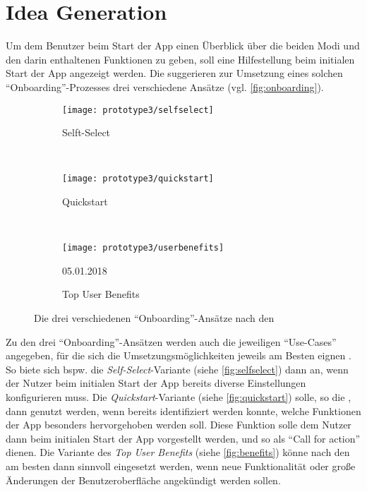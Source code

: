 \section{Idea Generation}\label{sec:idea3}
Um dem Benutzer beim Start der App einen Überblick über die beiden Modi und den darin enthaltenen Funktionen zu geben, soll eine Hilfestellung beim initialen Start der App angezeigt werden.
Die \mg{} suggerieren zur Umsetzung eines solchen ``Onboarding''-Prozesses drei verschiedene Ansätze (vgl. \autoref{fig:onboarding}). \\

\begin{figure}[h]
	\begin{subfigure}[t]{0.3\textwidth}
		\centering
		\texttt{[image: prototype3/selfselect]}
		\caption{Selft-Select}
		\label{fig:selfselect}
	\end{subfigure}
	~
	\begin{subfigure}[t]{0.3\textwidth}
		\centering
		\texttt{[image: prototype3/quickstart]}
		\caption{Quickstart}
		\label{fig:quickstart}
	\end{subfigure}
	~
	\begin{subfigure}[t]{0.3\textwidth}
		\centering
		\texttt{[image: prototype3/userbenefits]}
		\caption{Top User Benefits}{05.01.2018}
		\label{fig:benefits}
	\end{subfigure}
	\centering
	\caption{Die drei verschiedenen ``Onboarding''-Ansätze nach den \mg{}}
	\label{fig:onboarding}
\end{figure}

Zu den drei ``Onboarding''-Ansätzen werden auch die jeweiligen ``Use-Cases'' angegeben, für die sich die Umsetzungsmöglichkeiten jeweils am Besten eignen \citep[Abschnitt ``Usage'']{Onboarding}.
So biete sich bspw. die \emph{Self-Select}-Variante (siehe \autoref{fig:selfselect}) dann an, wenn der Nutzer beim initialen Start der App bereits diverse Einstellungen konfigurieren muss.
Die \emph{Quickstart}-Variante (siehe \autoref{fig:quickstart}) solle, so die \mg{}, dann genutzt werden, wenn bereits identifiziert werden konnte, welche Funktionen der App besonders hervorgehoben werden soll.
Diese Funktion solle dem Nutzer dann beim initialen Start der App vorgestellt werden, und so als ``Call for action'' dienen.
Die Variante des \emph{Top User Benefits} (siehe \autoref{fig:benefits}) könne nach den \mg{} am besten dann sinnvoll eingesetzt werden, wenn neue Funktionalität oder große Änderungen der Benutzeroberfläche angekündigt werden sollen. \\

